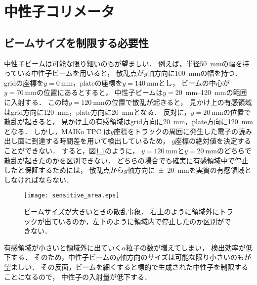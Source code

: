\documentclass[../master]{subfiles}
\begin{document}
\chapter{中性子コリメータ}
\label{cap::collimator}
\section{ビームサイズを制限する必要性}
中性子ビームは可能な限り細いのもが望ましい．
例えば，半径\SI{50}{\milli\metre}の幅を持っている中性子ビームを用いると，
散乱点が$y$軸方向に\SI{100}{\milli\metre}の幅を持つ．
gridの座標を$y = \SI{0}{\milli\metre}$，plateの座標を$y = \SI{140}{\milli\metre}$とし，
ビームの中心が$y = \SI{70}{\milli\metre}$の位置にあるとすると，
中性子ビームは$y = $\SIrange{20}{120}{\milli\metre}の範囲に入射する．
この時$y = \SI{120}{\milli\metre}$の位置で散乱が起きると，
見かけ上の有感領域はgrid方向に\SI{120}{\milli\metre}，plate方向に\SI{20}{\milli\metre}となる．
反対に，$y = \SI{20}{\milli\metre}$の位置で散乱が起きると，
見かけ上の有感領域はgrid方向に\SI{20}{\milli\metre}，plate方向に\SI{120}{\milli\metre}となる．
しかし，MAIKo TPC は$y$座標をトラックの周囲に発生した電子の読み出し面に到達する時間差を用いて検出しているため，
$y$座標の絶対値を決定することができない．
すると，図\ref{fig::sensitive_area}のように，
$y = \SI{120}{\milli\metre}$と$y = \SI{20}{\milli\metre}$のどちらで散乱が起きたのかを区別できない．
どちらの場合でも確実に有感領域中で停止したと保証するためには，
散乱点から$y$軸方向に\SI{\pm20}{\milli\metre}を実質の有感領域としなければならない．
\begin{figure}
  \centering
  \texttt{[image: sensitive\_area.eps]}
  \caption[ビームサイズが大きいときの散乱事象．]
          {ビームサイズが大きいときの散乱事象．
            右上のように領域外にトラックが出ているのか，左下のように領域内で停止したのか区別ができない．}
  \label{fig::sensitive_area}
\end{figure}

有感領域が小さいと領域外に出ていく$\alpha$粒子の数が増えてしまい，
検出効率が低下する．
そのため，中性子ビームの$y$軸方向のサイズは可能な限り小さいのもが望ましい．
その反面，ビームを細くすると標的で生成された中性子を制限することになるので，
中性子の入射量が低下する．
\end{document}
